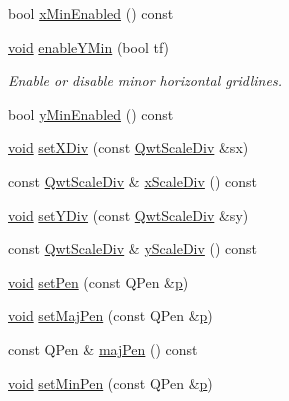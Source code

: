 \begin{DoxyCompactItemize}
bool \hyperlink{class_qwt_plot_grid_a2eeb5b2118f35409cb1450c2a032e8ff}{x\-Min\-Enabled} () const 
\item 
\hyperlink{group___u_a_v_objects_plugin_ga444cf2ff3f0ecbe028adce838d373f5c}{void} \hyperlink{class_qwt_plot_grid_a21b26d5b6b0745ecdec12d6bdeb8ecb4}{enable\-Y\-Min} (bool tf)
\begin{DoxyCompactList}\small\item\em Enable or disable minor horizontal gridlines. \end{DoxyCompactList}\item 
bool \hyperlink{class_qwt_plot_grid_af677551f6121de684888af6e2b77333f}{y\-Min\-Enabled} () const 
\item 
\hyperlink{group___u_a_v_objects_plugin_ga444cf2ff3f0ecbe028adce838d373f5c}{void} \hyperlink{class_qwt_plot_grid_aeeb88397c2aaf5e763d57c898a2fcd13}{set\-X\-Div} (const \hyperlink{class_qwt_scale_div}{Qwt\-Scale\-Div} \&sx)
\item 
const \hyperlink{class_qwt_scale_div}{Qwt\-Scale\-Div} \& \hyperlink{class_qwt_plot_grid_a4de2f1d11d5b24c0790db1e3dd0b3436}{x\-Scale\-Div} () const 
\item 
\hyperlink{group___u_a_v_objects_plugin_ga444cf2ff3f0ecbe028adce838d373f5c}{void} \hyperlink{class_qwt_plot_grid_a9eb130275560bdaa65551e2f69232b72}{set\-Y\-Div} (const \hyperlink{class_qwt_scale_div}{Qwt\-Scale\-Div} \&sy)
\item 
const \hyperlink{class_qwt_scale_div}{Qwt\-Scale\-Div} \& \hyperlink{class_qwt_plot_grid_a0da37b84786570c1ecff37ac18c6684c}{y\-Scale\-Div} () const 
\item 
\hyperlink{group___u_a_v_objects_plugin_ga444cf2ff3f0ecbe028adce838d373f5c}{void} \hyperlink{class_qwt_plot_grid_ad84a6b1110d593af76e5e777ae1e8bfe}{set\-Pen} (const Q\-Pen \&\hyperlink{glext_8h_aa5367c14d90f462230c2611b81b41d23}{p})
\item 
\hyperlink{group___u_a_v_objects_plugin_ga444cf2ff3f0ecbe028adce838d373f5c}{void} \hyperlink{class_qwt_plot_grid_ac749a9ba8c2d05f4da83c6f6f2f8a0ec}{set\-Maj\-Pen} (const Q\-Pen \&\hyperlink{glext_8h_aa5367c14d90f462230c2611b81b41d23}{p})
\item 
const Q\-Pen \& \hyperlink{class_qwt_plot_grid_a00cad53a757c6e724a68cc90eb1881bf}{maj\-Pen} () const 
\item 
\hyperlink{group___u_a_v_objects_plugin_ga444cf2ff3f0ecbe028adce838d373f5c}{void} \hyperlink{class_qwt_plot_grid_a012823a76b8a1a586b0f4326164e8c14}{set\-Min\-Pen} (const Q\-Pen \&\hyperlink{glext_8h_aa5367c14d90f462230c2611b81b41d23}{p})

\end{DoxyCompactItemize}
